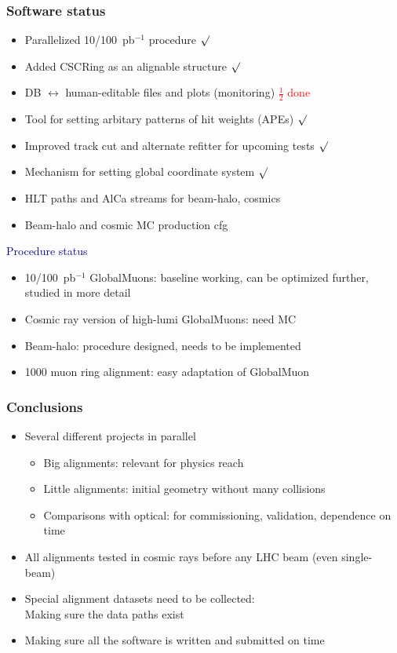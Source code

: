 \documentclass[compress]{beamer}
\begin{document}
\begin{frame}
\frametitle{Software status}
\begin{itemize}
\item Parallelized 10/100~pb$^{-1}$ procedure \hfill \textcolor{red}{$\surd$}
\item Added CSCRing as an alignable structure \hfill \textcolor{red}{$\surd$}
\item DB $\leftrightarrow$ human-editable files and plots (monitoring) \hfill \textcolor{red}{$\frac{1}{2}$ done}
\item Tool for setting arbitary patterns of hit weights (APEs) \hfill \textcolor{red}{$\surd$}
\item Improved track cut and alternate refitter for upcoming tests \hfill \textcolor{red}{$\surd$}
\item Mechanism for setting global coordinate system \hfill \textcolor{red}{$\surd$}
\item HLT paths and AlCa streams for beam-halo, cosmics
\item Beam-halo and cosmic MC production cfg
\end{itemize}

\hspace{-0.83 cm} \textcolor{darkblue}{\Large Procedure status}
\begin{itemize}
\item 10/100~pb$^{-1}$ GlobalMuons: baseline working, can be optimized further, studied in more detail
\item Cosmic ray version of high-lumi GlobalMuons: need MC
\item Beam-halo: procedure designed, needs to be implemented
\item 1000 muon ring alignment: easy adaptation of GlobalMuon
\end{itemize}

\end{frame}

\begin{frame}
\frametitle{Conclusions}
\begin{itemize}\setlength{\itemsep}{0.4 cm}
\item Several different projects in parallel
\begin{itemize}\setlength{\itemsep}{0.15 cm}
\item Big alignments: relevant for physics reach
\item Little alignments: initial geometry without many collisions
\item Comparisons with optical: for commissioning, validation, dependence on time
\end{itemize}

\item All alignments tested in cosmic rays before any LHC beam (even single-beam)

\item Special alignment datasets need to be collected: \\ Making sure the data paths exist

\item Making sure all the software is written and submitted on time
\end{itemize}
\label{numpages}
\end{frame}
\end{document}
